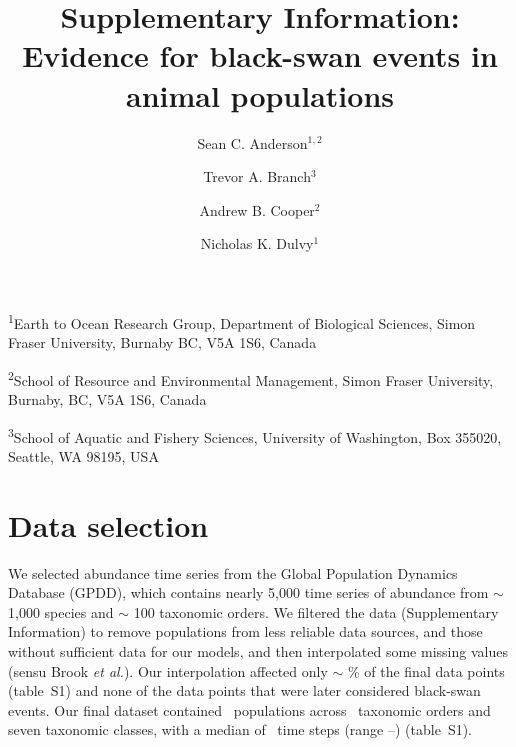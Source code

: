 \documentclass[12pt]{article}
\title{Supplementary Information:\\Evidence for black-swan events in animal
  populations}
\author{
Sean C. Anderson$^{1,2}$ \and
Trevor A. Branch$^3$ \and
Andrew B. Cooper$^2$ \and
Nicholas K. Dulvy$^1$
}
\date{}
\begin{document}
\nocite{taleb2007,sornette2009}
\nocite{meehl2004,katz2005,ipcc2012}
\nocite{taleb2007,sornette2009,may2008}
\nocite{taleb2007}
\nocite{newman2005}
\nocite{sornette2009}
\nocite{harnik2012}
\nocite{fey2015}
\nocite{mangel1994}
\nocite{ipcc2012}
\nocite{keitt1998,allen2001,halley2002}
\nocite{brook2006a,knape2012}
\nocite{SOM}
\nocite{saucy1994}
\nocite{stafford1971}
\nocite{stafford1971}
\nocite{potts1980}
\nocite{potts1980}
\nocite{allen2001}
\nocite{schindler2010}
\nocite{carpenter2006}
\nocite{nunez2012}
\nocite{meehl2004,katz2005,ipcc2012}
\nocite{kirby2009}
\nocite{denny2009}
\nocite{nrc2007}
\nocite{caddy1996}
\nocite{schindler2010}
\nocite{doak2008,lindenmayer2010}
\nocite{mangel1994}
\nocite{loreau2010a,thompson2013}
\nocite{meehl2004,ipcc2012,thompson2013}
\nocite{rachev2008}


\maketitle

\textsuperscript{1}Earth to Ocean Research Group, Department of Biological
Sciences, Simon Fraser University, Burnaby BC, V5A 1S6, Canada

\textsuperscript{2}School of Resource and Environmental Management, Simon
Fraser University, Burnaby, BC, V5A 1S6, Canada

\textsuperscript{3}School of Aquatic and Fishery Sciences, University of
Washington, Box 355020, Seattle, WA 98195, USA

\linenumbers
\onehalfspacing




\section{Data selection}

We selected abundance time series from the Global Population Dynamics Database\cite{gpdd2010} (GPDD), which contains nearly 5,000 time series of abundance from \(\sim\) 1,000 species and \(\sim\) 100 taxonomic orders. We filtered the data (Supplementary Information) to remove populations from less reliable data sources, and those without sufficient data for our models, and then interpolated some missing values (sensu Brook \textit{et al.}\cite{brook2006a}). Our interpolation affected only \(\sim\) \interpPointsPerc \% of the final data points (table~S1) and none of the data points that were later considered black-swan events. Our final dataset contained \NPops\ populations across \NOrders\ taxonomic orders and seven taxonomic classes, with a median of \medianTimeSteps\ time steps (range \minTimeSteps--\maxTimeSteps) (table~S1).
\end{document}
